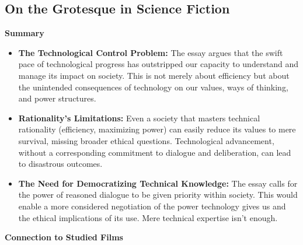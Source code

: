 \documentclass[11pt,fleqn]{book}
\begin{document}
\subsection{On the Grotesque in Science Fiction}
\textbf{Summary}

\begin{itemize}
\item \textbf{The Technological Control Problem:} The essay argues that the swift pace of technological progress has outstripped our capacity to understand and manage its impact on society. This is not merely about efficiency but about the unintended consequences of technology on our values, ways of thinking, and power structures.

\item \textbf{Rationality's Limitations:} Even a society that masters technical rationality (efficiency, maximizing power) can easily reduce its values to mere survival, missing broader ethical questions. Technological advancement, without a corresponding commitment to dialogue and deliberation, can lead to disastrous outcomes.

\item \textbf{The Need for Democratizing Technical Knowledge:} The essay calls for the power of reasoned dialogue to be given priority within society. This would enable a more considered negotiation of the power technology gives us and the ethical implications of its use. Mere technical expertise isn't enough. 
\end{itemize}
\vspace{5pt}
\textbf{Connection to Studied Films}
\end{document}

